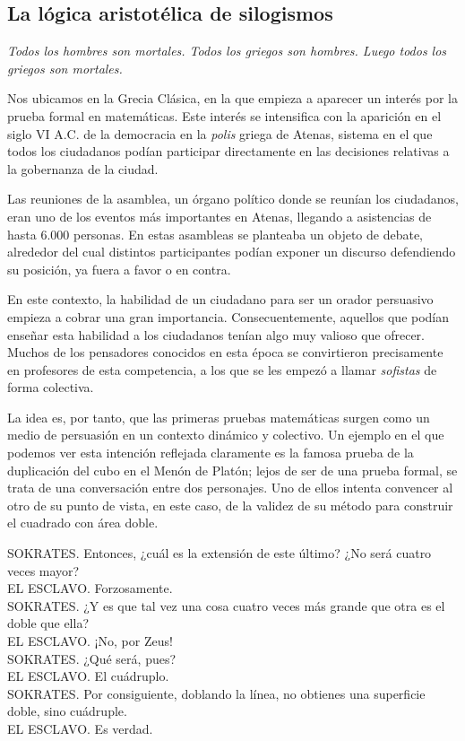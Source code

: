 \documentclass{article}
\begin{document}
\subsection{La lógica aristotélica de silogismos}

\begin{displayquote}
    \textit{Todos los hombres son mortales. Todos los griegos son hombres. Luego todos los griegos son mortales.}
\end{displayquote}

Nos ubicamos en la Grecia Clásica, en la que empieza a aparecer un interés por la prueba formal en matemáticas. Este interés se intensifica con la aparición en el siglo VI A.C. de la democracia en la \textit{polis} griega de Atenas, sistema en el que todos los ciudadanos podían participar directamente en las decisiones relativas a la gobernanza de la ciudad.

Las reuniones de la asamblea, un órgano político donde se reunían los ciudadanos, eran uno de los eventos más importantes en Atenas, llegando a asistencias de hasta 6.000 personas. En estas asambleas se planteaba un objeto de debate, alrededor del cual distintos participantes podían exponer un discurso defendiendo su posición, ya fuera a favor o en contra.

En este contexto, la habilidad de un ciudadano para ser un orador persuasivo empieza a cobrar una gran importancia. Consecuentemente, aquellos que podían enseñar esta habilidad a los ciudadanos tenían algo muy valioso que ofrecer. Muchos de los pensadores conocidos en esta época se convirtieron precisamente en profesores de esta competencia, a los que se les empezó a llamar \textit{sofistas} de forma colectiva.

La idea es, por tanto, que las primeras pruebas matemáticas surgen como un medio de persuasión en un contexto dinámico y colectivo. Un ejemplo en el que podemos ver esta intención reflejada claramente es la famosa prueba de la duplicación del cubo en el Menón de Platón\cite{novaes2020dialogical}; lejos de ser de una prueba formal, se trata de una conversación entre dos personajes. Uno de ellos intenta convencer al otro de su punto de vista, en este caso, de la validez de su método para construir el cuadrado con área doble.

\newpage

\begin{displayquote}
SOKRATES. Entonces, ¿cuál es la extensión de este último? ¿No será cuatro veces mayor?\\
EL ESCLAVO. Forzosamente.\\
SOKRATES. ¿Y es que tal vez una cosa cuatro veces más grande que otra es el doble que ella?\\
EL ESCLAVO. ¡No, por Zeus!\\
SOKRATES. ¿Qué será, pues?\\
EL ESCLAVO. El cuádruplo.\\
SOKRATES. Por consiguiente, doblando la línea, no obtienes una superficie doble, sino cuádruple.\\
EL ESCLAVO. Es verdad.\cite{bergua1958dialogos}
\end{displayquote}
\end{document}

